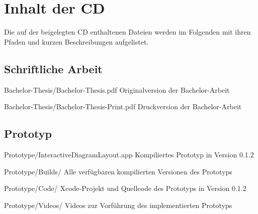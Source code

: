 
\chapter{Inhalt der CD}
\label{chapter:cd-content}

Die auf der beigelegten CD enthaltenen Dateien werden im Folgenden mit ihren Pfaden und kurzen Beschreibungen aufgelistet.

\newenvironment{fileslist}{
    \renewcommand\descriptionlabel[1]{\texttt{##1}}
    \setlength{\leftmargini}{0em}
    \begin{description}[style=nextline]
}{
    \end{description}
}

\section{Schriftliche Arbeit}

\begin{fileslist}

\item[Bachelor-Thesis/Bachelor-Thesis.pdf] 
Originalversion der Bachelor-Arbeit

\item[Bachelor-Thesis/Bachelor-Thesis-Print.pdf] 
Druckversion der Bachelor-Arbeit

\end{fileslist}

\section{Prototyp}
\label{sec:cd-content-prototype}

\begin{fileslist}

\item[Prototype/InteractiveDiagramLayout.app]
Kompiliertes Prototyp in Version 0.1.2

\item[Prototype/Builds/]
Alle verfügbaren kompilierten Versionen des Prototyps

\item[Prototype/Code/] 
Xcode-Projekt und Quellcode des Prototyps in Version 0.1.2

\item[Prototype/Videos/] 
Videos zur Vorführung des implementierten Prototyps

\end{fileslist}

